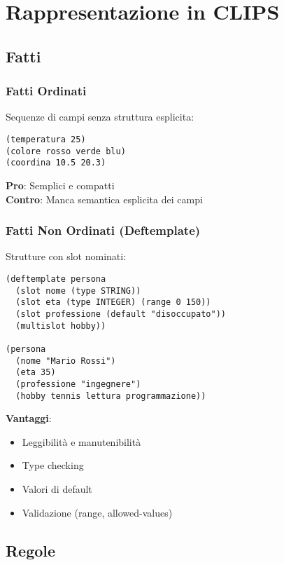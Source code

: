 \section{Rappresentazione in CLIPS}

\subsection{Fatti}

\subsubsection{Fatti Ordinati}

Sequenze di campi senza struttura esplicita:

\begin{lstlisting}[language=CLIPS]
(temperatura 25)
(colore rosso verde blu)
(coordina 10.5 20.3)
\end{lstlisting}

\textbf{Pro}: Semplici e compatti \\
\textbf{Contro}: Manca semantica esplicita dei campi

\subsubsection{Fatti Non Ordinati (Deftemplate)}

Strutture con slot nominati:

\begin{lstlisting}[language=CLIPS]
(deftemplate persona
  (slot nome (type STRING))
  (slot eta (type INTEGER) (range 0 150))
  (slot professione (default "disoccupato"))
  (multislot hobby))

(persona 
  (nome "Mario Rossi") 
  (eta 35) 
  (professione "ingegnere")
  (hobby tennis lettura programmazione))
\end{lstlisting}

\textbf{Vantaggi}:
\begin{itemize}
\item Leggibilità e manutenibilità
\item Type checking
\item Valori di default
\item Validazione (range, allowed-values)
\end{itemize}

\subsection{Regole}

